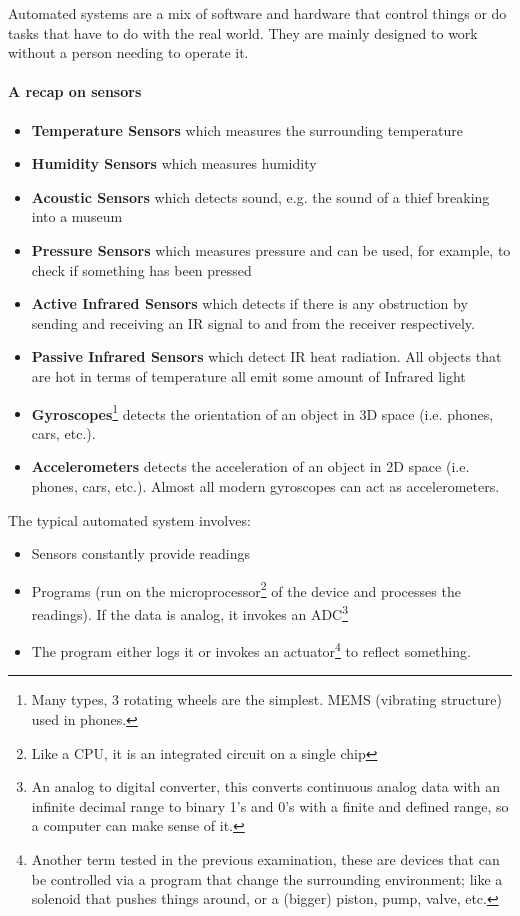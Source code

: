 \documentclass[../main.tex]{subfiles}
\begin{document}
Automated systems are a mix of software and hardware that control things or do tasks that have to do with the real world. They are mainly designed to work without a person needing to operate it.

\paragraph{A recap on sensors}

\begin{itemize}
    \item \textbf{Temperature Sensors} which measures the surrounding temperature
    \item \textbf{Humidity Sensors} which measures humidity
    \item \textbf{Acoustic Sensors} which detects sound, e.g. the sound of a thief breaking into a museum
    \item \textbf{Pressure Sensors} which measures pressure and can be used, for example, to check if something has been pressed
    \item \textbf{Active Infrared Sensors} which detects if there is any obstruction by sending and receiving an IR signal to and from the receiver respectively. 
    \item \textbf{Passive Infrared Sensors} which detect IR heat radiation. All objects that are hot in terms of temperature all emit some amount of Infrared light
    \item \textbf{Gyroscopes}\footnote{Many types, 3 rotating wheels are the simplest. MEMS (vibrating structure) used in phones.} detects the orientation of an object in 3D space (i.e. phones, cars, etc.). 
    \item \textbf{Accelerometers} detects the acceleration of an object in 2D space (i.e. phones, cars, etc.). Almost all modern gyroscopes can act as accelerometers.
\end{itemize}

The typical automated system involves:

\begin{itemize}
    \item Sensors constantly provide readings
    \item Programs (run on the microprocessor\footnote{Like a CPU, it is an integrated circuit on a single chip} of the device and processes the readings). If the data is analog, it invokes an ADC\footnote{An analog to digital converter, this converts continuous analog data with an infinite decimal range to binary 1’s and 0’s with a finite and defined range, so a computer can make sense of it.}
    \item The program either logs it or invokes an actuator\footnote{Another term tested in the previous examination, these are devices that can be controlled via a program that change the surrounding environment; like a solenoid that pushes things around, or a (bigger) piston, pump, valve, etc.} to reflect something.
\end{itemize}
\end{document}

